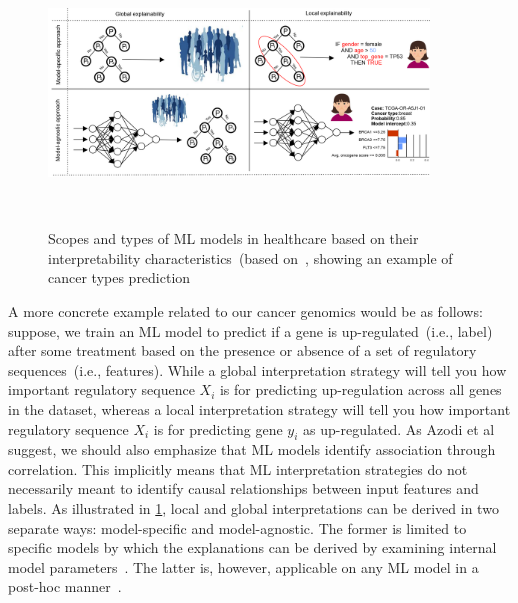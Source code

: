 \begin{figure}[h]
	\centering
	\includegraphics[width=0.9\textwidth,height=70mm]{images/lvg_cancer.png}	
    \caption{Scopes and types of ML models in healthcare based on their interpretability characteristics~(based on~\cite{stiglic2020interpretability}, showing an example of cancer types prediction}	
	\label{fig:local_vs_global_ex}
\end{figure}

\hspace*{3.5mm} A more concrete example related to our cancer genomics would be as follows: suppose, we train an ML model to predict if a gene is up-regulated~(i.e., label) after some treatment based on the presence or absence of a set of regulatory sequences~(i.e., features). While a global interpretation strategy will tell you how important regulatory sequence $X_i$ is for predicting up-regulation across all genes in the dataset, whereas a local interpretation strategy will tell you how important regulatory sequence $X_i$ is for predicting gene $y_i$ as up-regulated. As Azodi et al~\cite{azodi2020opening} suggest, we should also emphasize that ML models identify association through correlation. This implicitly means that ML interpretation strategies do not necessarily meant to identify causal relationships between input features and labels. %
As illustrated in \cref{fig:local_vs_global_ex}, local and global interpretations can be derived in two separate ways: model-specific and model-agnostic. The former is limited to specific models by which the explanations can be derived by examining internal model parameters~\cite{stiglic2020interpretability}. The latter is, however, applicable on any ML model in a post-hoc manner~\cite{molnar2019interpretable}. 

